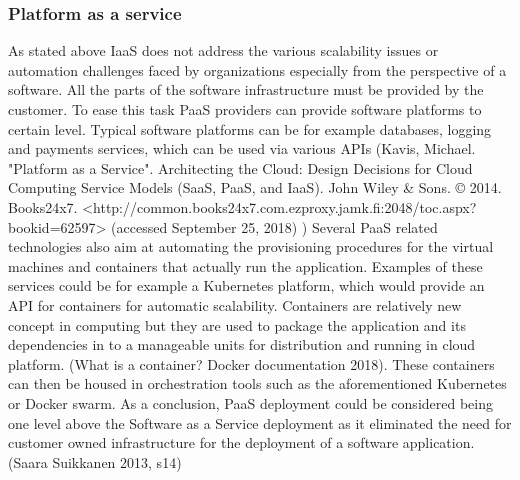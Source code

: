 \documentclass{article}
\begin{document}
\subsubsection{Platform as a service}
As stated above IaaS does not address the various scalability issues or automation challenges faced by organizations especially from the perspective of a software. All the parts of the software infrastructure must be provided by the customer. To ease this task PaaS providers can provide software platforms to certain level. Typical software platforms can be for example databases, logging and payments services, which can be used via various APIs (Kavis, Michael. "Platform as a Service". Architecting the Cloud: Design Decisions for Cloud Computing Service Models (SaaS, PaaS, and IaaS). John Wiley \& Sons. © 2014. Books24x7. <http://common.books24x7.com.ezproxy.jamk.fi:2048/toc.aspx?bookid=62597> (accessed September 25, 2018) )
Several PaaS related technologies also aim at automating the provisioning procedures for the virtual machines and containers that actually run the application. Examples of these services could be for example a Kubernetes platform, which would provide an API for containers for automatic scalability. Containers are relatively new concept in computing but they are used to package the application and its dependencies in to a manageable units for distribution and running in cloud platform. (What is a container? Docker documentation 2018). These containers can then be housed in orchestration tools such as the aforementioned Kubernetes or Docker swarm.
As a conclusion, PaaS deployment could be considered being one level above the Software as a Service deployment as it eliminated the need for customer owned infrastructure for the deployment of a software application. (Saara Suikkanen 2013, s14)
\end{document}
